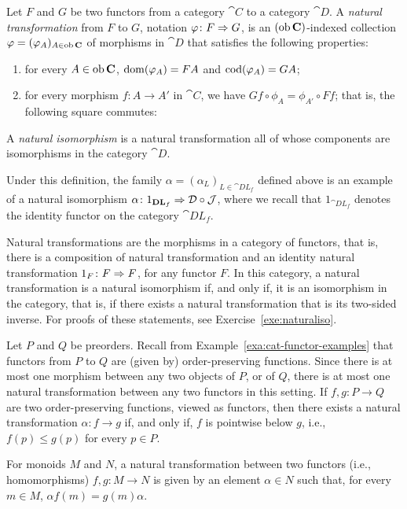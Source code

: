 \begin{definition}
  Let $F$ and $G$ be two functors from a category $\cat{C}$ to a category $\cat{D}$. A \emph{natural transformation} from $F$ to $G$, notation $\varphi \colon F \Rightarrow G$, is an $(\operatorname{\mathrm{ob}} \mathbf{C})$-indexed collection $\varphi = (\varphi_A)_{A \in \operatorname{\mathrm{ob}} \mathbf{C}}$ of morphisms in $\cat{D}$ that satisfies the following properties:
  \begin{enumerate}
  \item for every $A \in \operatorname{\mathrm{ob}} \mathbf{C}$, $\operatorname{\mathrm{dom}}(\varphi_A) = FA$ and $\operatorname{\mathrm{cod}}(\varphi_A) = GA$;
  \item for every morphism $f \colon A \to A'$ in $\cat{C}$, we have $Gf \circ \phi_A = \phi_{A'} \circ Ff$; that is, the following square commutes:
    \begin{center}
  \end{center}
\end{enumerate}
A \emph{natural isomorphism} is a natural transformation all of whose components are isomorphisms in the category $\cat{D}$.
\end{definition}
Under this definition, the family $\alpha = (\alpha_L)_{L \in \cat{DL}_f}$ defined above is an example of a natural isomorphism $\alpha \colon 1_{\mathbf{DL}_f} \Rightarrow \mathcal{D} \circ \mathcal{J}$, where we recall that $1_{\cat{DL}_f}$ denotes the identity functor on the category $\cat{DL}_f$.

Natural transformations are the morphisms in a category of functors, that is, there is a composition of natural transformation and an identity natural transformation $1_F \colon F \Rightarrow F$, for any functor $F$. In this category, a natural transformation is a natural isomorphism if, and only if, it is an isomorphism in the category, that is, if there exists a natural transformation that is its two-sided inverse. For proofs of these statements, see Exercise~\ref{exe:naturaliso}.

\begin{example}
Let $P$ and $Q$ be preorders. Recall from Example~\ref{exa:cat-functor-examples} that functors from $P$ to $Q$ are (given by) order-preserving functions. Since there is at most one morphism between any two objects of $P$, or of $Q$, there is at most one natural transformation between any two functors in this setting. If $f, g \colon P \to Q$ are two order-preserving functions, viewed as functors, then there exists a natural transformation $\alpha \colon f \to g$ if, and only if, $f$ is pointwise below $g$, i.e., $f(p) \leq g(p)$ for every $p \in P$.

For monoids $M$ and $N$, a natural transformation between two functors (i.e., homomorphisms) $f, g \colon M \to N$ is given by an element $\alpha \in N$ such that, for every $m \in M$, $\alpha f(m) = g(m) \alpha$.
\end{example}
